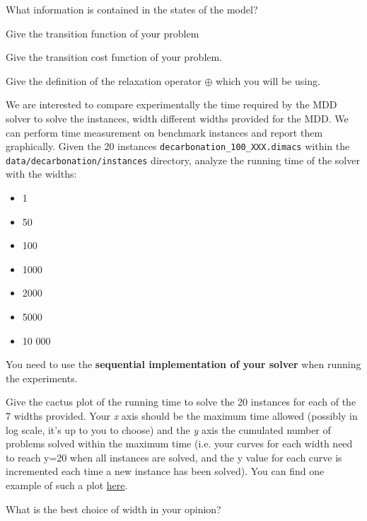 \documentclass[12pt]{report}
\newcommand{\answerbox}[2]{\hfill\break\\
	\framebox[\linewidth]{\parbox[c][#1][c]{\dimexpr\linewidth-2\fboxsep-2\fboxrule}{#2}}
}
\begin{document}
\begin{Exercise}[title={Building Nuclear Plants}]
\begin{center}
		\end{center}

		\Question What information is contained in the states of the model?
		\answerbox{4cm}{
		}

		\Question Give the transition function of your problem
		\answerbox{3cm}{
		}

		\Question Give the transition cost function of your problem.
		\answerbox{3cm}{
		}

		\Question Give the definition of the relaxation operator $\oplus$ which you will be using.
		\answerbox{3cm}{
		}
	\end{Exercise}

	\begin{Exercise}[title={Experimental comparison of widths}]

		We are interested to compare experimentally the time required by the MDD solver to solve the instances, width different widths provided for the MDD.
		We can perform time measurement on benchmark instances and report them graphically.
		Given the 20 instances \texttt{decarbonation\_100\_XXX.dimacs} within the \texttt{data/decarbonation/instances} directory, analyze the running time of the solver with the widths:
		\begin{itemize}
			\item 1
			\item 50
			\item 100
			\item 1000
			\item 2000
			\item 5000
			\item 10 000
		\end{itemize}
		You need to use the \textbf{sequential implementation of your solver} when running the experiments.


		\Question Give the cactus plot of the running time to solve the 20 instances for each of the 7 widths provided. Your \textit{x} axis should be the maximum time allowed (possibly in log scale, it's up to you to choose) and the \textit{y} axis the cumulated number of problems solved within the maximum time (i.e. your curves for each width need to reach y=20 when all instances are solved, and the y value for each curve is incremented each time a new instance has been solved). You can find one example of such a plot \href{https://jeremiasberg.files.wordpress.com/2021/10/cactus_plot_side_v4.jpg?w=346&h=205}{here}.
		\answerbox{8cm}{
		}

		\Question What is the best choice of width in your opinion?
		\answerbox{2.5cm}{
		}


	\end{Exercise}
\end{document}
